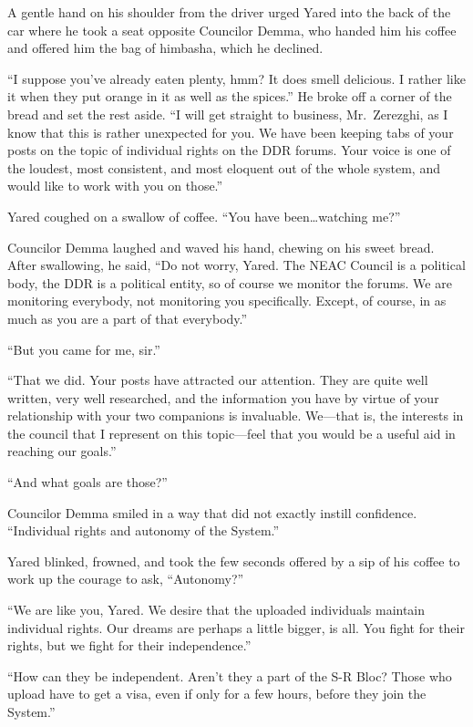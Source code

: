 A gentle hand on his shoulder from the driver urged Yared into the back of the car where he took a seat opposite Councilor Demma, who handed him his coffee and offered him the bag of himbasha, which he declined.

``I suppose you've already eaten plenty, hmm? It does smell delicious. I rather like it when they put orange in it as well as the spices.'' He broke off a corner of the bread and set the rest aside. ``I will get straight to business, Mr.~Zerezghi, as I know that this is rather unexpected for you. We have been keeping tabs of your posts on the topic of individual rights on the DDR forums. Your voice is one of the loudest, most consistent, and most eloquent out of the whole system, and would like to work with you on those.''

Yared coughed on a swallow of coffee. ``You have been\ldots watching me?''

Councilor Demma laughed and waved his hand, chewing on his sweet bread. After swallowing, he said, ``Do not worry, Yared. The NEAC Council is a political body, the DDR is a political entity, so of course we monitor the forums. We are monitoring everybody, not monitoring you specifically. Except, of course, in as much as you are a part of that everybody.''

``But you came for me, sir.''

``That we did. Your posts have attracted our attention. They are quite well written, very well researched, and the information you have by virtue of your relationship with your two companions is invaluable. We---that is, the interests in the council that I represent on this topic---feel that you would be a useful aid in reaching our goals.''

``And what goals are those?''

Councilor Demma smiled in a way that did not exactly instill confidence. ``Individual rights and autonomy of the System.''

Yared blinked, frowned, and took the few seconds offered by a sip of his coffee to work up the courage to ask, ``Autonomy?''

``We are like you, Yared. We desire that the uploaded individuals maintain individual rights. Our dreams are perhaps a little bigger, is all. You fight for their rights, but we fight for their independence.''

``How can they be independent. Aren't they a part of the S-R Bloc? Those who upload have to get a visa, even if only for a few hours, before they join the System.''

